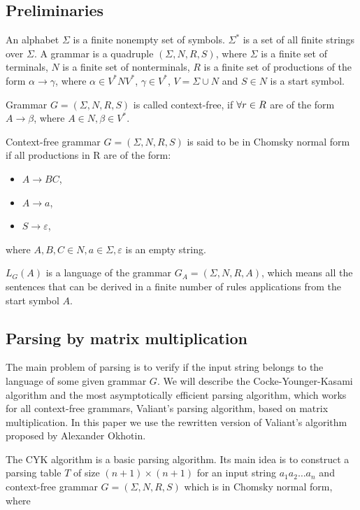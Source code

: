 \subsection{Preliminaries}

An alphabet $\Sigma$ is a finite nonempty set of symbols. $\Sigma^{*}$ is a set of all finite strings over $\Sigma$.
A grammar is a quadruple $(\Sigma, N, R, S)$, where $\Sigma$ is a finite set of terminals, $N$ is a finite set of nonterminals, $R$ is a finite set of productions of the form $\alpha \rightarrow \gamma$, where $\alpha \in V^{*}NV^{*}$, $\gamma \in V^{*}$, $V = \Sigma \cup N$ and $S \in N$ is a start symbol.

Grammar $G = (\Sigma, N, R, S)$ is called context-free, if $\space\forall r \in R$ are of the form $A \rightarrow \beta$, where $A \in N, \beta \in V^{*}$.

Context-free grammar $G = (\Sigma, N, R, S)$ is said to be in Chomsky normal form if all productions in R are of the form:
\begin{itemize}
  \item $A \rightarrow BC$,
  \item $A \rightarrow a$,
  \item $S \rightarrow \varepsilon$,
\end{itemize}
where $A, B, C \in N, a \in \Sigma, \varepsilon$ is an empty string.

$L_{G}(A)$ is a language of the grammar $G_{A} = (\Sigma, N, R, A)$, which means all the sentences that can be derived in a finite number of rules applications from the start symbol $A$.

\subsection{Parsing by matrix multiplication}

The main problem of parsing is to verify if the input string belongs to the language of some given grammar $G$. We will describe the Cocke-Younger-Kasami algorithm and the most asymptotically efficient parsing algorithm, which works for all context-free grammars, Valiant's parsing algorithm, based on matrix multiplication. In this paper we use the rewritten version of Valiant's algorithm proposed by Alexander Okhotin.

The CYK algorithm is a basic parsing algorithm.
Its main idea is to construct a parsing table $T$ of size $(n + 1) \times (n + 1)$ for an input string $a_{1}a_{2} \dots a_{n}$ and context-free grammar $G = (\Sigma, N, R, S)$ which is in Chomsky normal form, where

